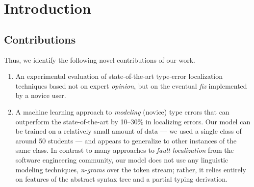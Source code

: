 \section{Introduction}
\label{sec:introduction}

\subsection{Contributions}
\label{sec:contributions}
Thus, we identify the following novel contributions of our work.
%
\begin{enumerate}
\item An experimental evaluation of state-of-the-art type-error
  localization techniques based not on expert \emph{opinion}, but
  on the eventual \emph{fix} implemented by a novice user.
\item A machine learning approach to \emph{modeling} (novice) type
  errors that can outperform the state-of-the-art by 10--30\% in
  localizing errors.
  Our model can be trained on a relatively small amount of data --- we
  used a single class of around 50 students --- and appears to
  generalize to other instances of the same class.
  In contrast to many approaches to \emph{fault localization} from the
  software engineering community, our model does not use any linguistic
  modeling techniques, \eg \emph{n-grams} over the token stream; rather,
  it relies entirely on features of the abstract syntax tree and a
  partial typing derivation.
\end{enumerate}

